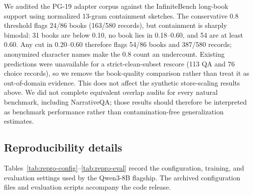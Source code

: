 We audited the PG-19 adapter corpus against the InfiniteBench long-book support
using normalized 13-gram containment sketches. The conservative 0.8 threshold
flags 24/86 books (163/580 records), but containment is sharply bimodal: 31 books
are below 0.10, no book lies in 0.18--0.60, and 54 are at least 0.60. Any cut in
0.20--0.60 therefore flags 54/86 books and 387/580 records; anonymized character
names make the 0.8 count an undercount. Existing predictions were unavailable
for a strict-clean-subset rescore (113 QA and 76 choice records), so we remove
the book-quality comparison rather than treat it as out-of-domain evidence.
This does not affect the synthetic store-scaling results above.
We did not complete equivalent overlap audits for every natural benchmark,
including NarrativeQA; those results should therefore be interpreted as
benchmark performance rather than contamination-free generalization estimates.

\subsection{Reproducibility details}
\label{app:reproducibility}
Tables~\ref{tab:repro-config}--\ref{tab:repro-eval} record the configuration,
training, and evaluation settings used by the Qwen3-8B flagship. The archived
configuration files and evaluation scripts accompany the code release.

